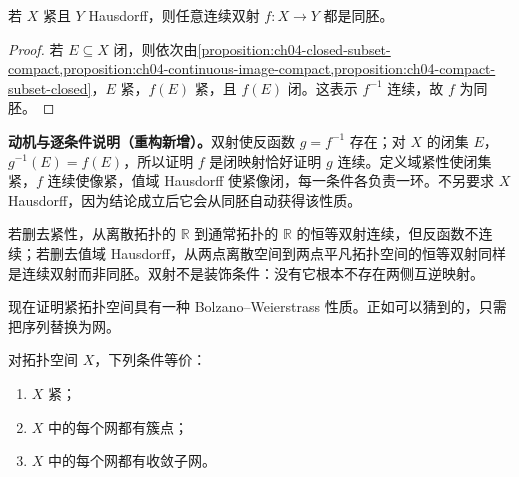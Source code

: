 \documentclass[../../main.tex]{subfiles}%
\begin{document}
\begin{proposition}\label{proposition:ch04-compact-bijection-homeomorphism}
若 $X$ 紧且 $Y$ Hausdorff，则任意连续双射 $f:X\to Y$ 都是同胚。
\end{proposition}
\begin{proof}
若 $E\subseteq X$ 闭，则依次由\cref{proposition:ch04-closed-subset-compact,proposition:ch04-continuous-image-compact,proposition:ch04-compact-subset-closed}，$E$ 紧，$f(E)$ 紧，且 $f(E)$ 闭。这表示 $f^{-1}$ 连续，故 $f$ 为同胚。
\end{proof}
\begin{remark}
\textbf{动机与逐条件说明（重构新增）。}双射使反函数 $g=f^{-1}$ 存在；对 $X$ 的闭集 $E$，$g^{-1}(E)=f(E)$，所以证明 $f$ 是闭映射恰好证明 $g$ 连续。定义域紧性使闭集紧，$f$ 连续使像紧，值域 Hausdorff 使紧像闭，每一条件各负责一环。不另要求 $X$ Hausdorff，因为结论成立后它会从同胚自动获得该性质。

若删去紧性，从离散拓扑的 $\mathbb R$ 到通常拓扑的 $\mathbb R$ 的恒等双射连续，但反函数不连续；若删去值域 Hausdorff，从两点离散空间到两点平凡拓扑空间的恒等双射同样是连续双射而非同胚。双射不是装饰条件：没有它根本不存在两侧互逆映射。
\end{remark}
现在证明紧拓扑空间具有一种 Bolzano--Weierstrass 性质。正如可以猜到的，只需把序列替换为网。
\begin{theorem}\label{theorem:ch04-compact-nets}
对拓扑空间 $X$，下列条件等价：
\begin{enumerate}
\item\label{item:ch04-compact-nets-cover} $X$ 紧；
\item\label{item:ch04-compact-nets-cluster} $X$ 中的每个网都有簇点；
\item\label{item:ch04-compact-nets-subnet} $X$ 中的每个网都有收敛子网。
\end{enumerate}
\end{theorem}
\end{document}
